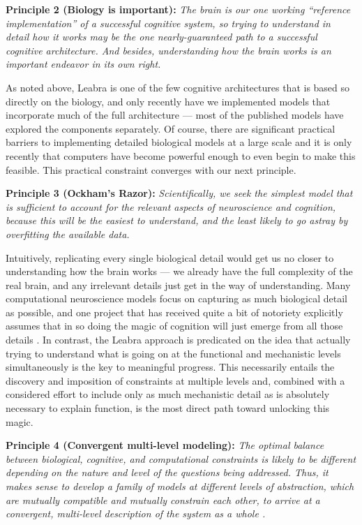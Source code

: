 \documentclass[11pt,twoside]{article}
\begin{document}
{\bf Principle 2 (Biology is important):} {\em The brain is our one
  working ``reference implementation'' of a successful cognitive
  system, so trying to understand in detail how it works may be the
  one nearly-guaranteed path to a successful cognitive architecture.
  And besides, understanding how the brain works is an important
  endeavor in its own right. }

As noted above, Leabra is one of the few cognitive architectures that
is based so directly on the biology, and only recently have we
implemented models that incorporate much of the full architecture ---
most of the published models have explored the components separately.
Of course, there are significant practical barriers to implementing
detailed biological models at a large scale and it is only recently
that computers have become powerful enough to even begin to make this
feasible.  This practical constraint converges with our next
principle.

{\bf Principle 3 (Ockham's Razor):} {\em Scientifically, we seek the
  simplest model that is sufficient to account for the relevant
  aspects of neuroscience and cognition, because this will be the
  easiest to understand, and the least likely to go astray by
  overfitting the available data.}

Intuitively, replicating every single biological detail would get us
no closer to understanding how the brain works --- we already have the
full complexity of the real brain, and any irrelevant details just get
in the way of understanding.  Many computational neuroscience models
focus on capturing as much biological detail as possible, and one
project that has received quite a bit of notoriety explicitly assumes
that in so doing the magic of cognition will just emerge from all
those details \cite{MarkramBlueBrain}.  In contrast, the Leabra
approach is predicated on the idea that actually trying to understand
what is going on at the functional and mechanistic levels
simultaneously is the key to meaningful progress. This necessarily
entails the discovery and imposition of constraints at multiple levels
and, combined with a considered effort to include only as much
mechanistic detail as is absolutely necessary to explain function, is
the most direct path toward unlocking this magic.

{\bf Principle 4 (Convergent multi-level modeling):} {\em The optimal
  balance between biological, cognitive, and computational constraints
  is likely to be different depending on the nature and level of the
  questions being addressed.  Thus, it makes sense to develop a family
  of models at different levels of abstraction, which are mutually
  compatible and mutually constrain each other, to arrive at a
  convergent, multi-level description of the system as a whole
  \cite{JilkLebiereOReillyEtAl08}.}
\end{document}
